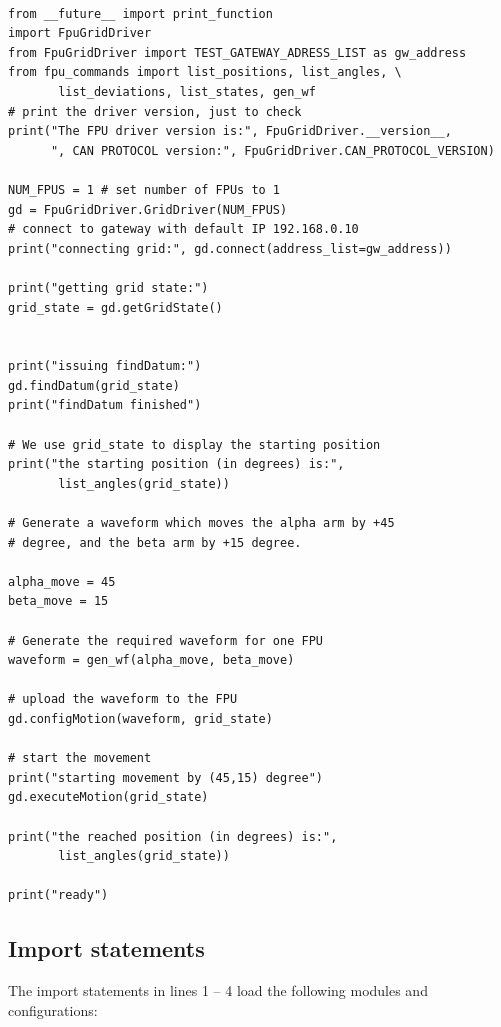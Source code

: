 \documentclass[11pt,a4paper]{scrartcl}
\begin{document}
\begin{verbatim}

from __future__ import print_function
import FpuGridDriver
from FpuGridDriver import TEST_GATEWAY_ADRESS_LIST as gw_address
from fpu_commands import list_positions, list_angles, \
       list_deviations, list_states, gen_wf
# print the driver version, just to check
print("The FPU driver version is:", FpuGridDriver.__version__,
      ", CAN PROTOCOL version:", FpuGridDriver.CAN_PROTOCOL_VERSION)

NUM_FPUS = 1 # set number of FPUs to 1
gd = FpuGridDriver.GridDriver(NUM_FPUS)
# connect to gateway with default IP 192.168.0.10
print("connecting grid:", gd.connect(address_list=gw_address))

print("getting grid state:")
grid_state = gd.getGridState()


print("issuing findDatum:")
gd.findDatum(grid_state)
print("findDatum finished")

# We use grid_state to display the starting position
print("the starting position (in degrees) is:",
       list_angles(grid_state))

# Generate a waveform which moves the alpha arm by +45
# degree, and the beta arm by +15 degree. 

alpha_move = 45
beta_move = 15

# Generate the required waveform for one FPU
waveform = gen_wf(alpha_move, beta_move)

# upload the waveform to the FPU
gd.configMotion(waveform, grid_state)

# start the movement
print("starting movement by (45,15) degree")
gd.executeMotion(grid_state)

print("the reached position (in degrees) is:",
       list_angles(grid_state))

print("ready")

\end{verbatim}


\subsection{Import statements}

The import statements in lines 1 -- 4 load the following modules and
configurations:
\end{document}
